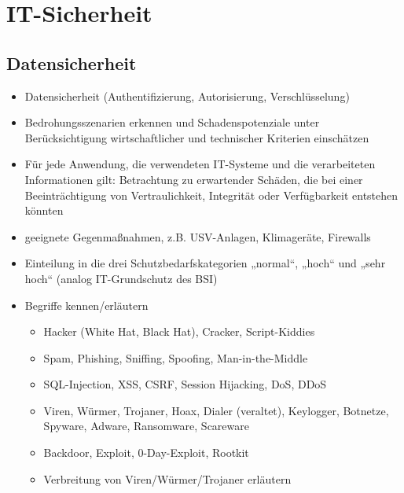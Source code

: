 \section{IT-Sicherheit}
\label{sec:IT-Sicherheit}

\subsection{Datensicherheit}
\label{sec:Datensicherheit}


\begin{itemize}
	\item Datensicherheit (Authentifizierung, Autorisierung, Verschlüsselung)
	\item Bedrohungsszenarien erkennen und Schadenspotenziale unter Berücksichtigung wirtschaftlicher und technischer Kriterien einschätzen
	\item Für jede Anwendung, die verwendeten IT-Systeme und die verarbeiteten Informationen gilt: Betrachtung zu erwartender Schäden, die bei einer Beeinträchtigung von Vertraulichkeit, Integrität oder Verfügbarkeit entstehen könnten
	\item geeignete Gegenmaßnahmen, z.B. USV-Anlagen, Klimageräte, Firewalls
	\item Einteilung in die drei Schutzbedarfskategorien „normal“, „hoch“ und „sehr hoch“ (analog IT-Grundschutz des BSI)
	\item Begriffe kennen/erläutern
	\begin{itemize}
		\item Hacker (White Hat, Black Hat), Cracker, Script-Kiddies
		\item Spam, Phishing, Sniffing, Spoofing, Man-in-the-Middle
		\item SQL-Injection, XSS, CSRF, Session Hijacking, DoS, DDoS
		\item Viren, Würmer, Trojaner, Hoax, Dialer (veraltet), Keylogger, Botnetze, Spyware, Adware, Ransomware, Scareware
		\item Backdoor, Exploit, 0-Day-Exploit, Rootkit
		\item Verbreitung von Viren/Würmer/Trojaner erläutern
	\end{itemize}
	
\end{itemize}